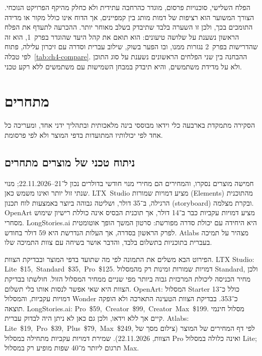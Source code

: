 הפלח השלישי, סוכנויות פרסום, מוגדר כהרחבה עתידית ולא כחלק מהיקף הפרויקט הנוכחי. הצורך המשוער הוא רציפות של דמות מותג בין קמפיינים, אך הדוח אינו כולל מקור או מדידה התומכים בכך, ולכן זו השערה בלבד שתיבדק בשלב מאוחר יותר. ההכרעה לתעדף את הפלח הראשון נשענת על שלושה טיעונים: הוא תואם את קהל היעד שהוגדר בפרק~1, הוא זה שהדרישות בפרק~2 נגזרות ממנו, ובו הפער בשוק, שילוב עברית וסדרה עם זיכרון עלילה, פתוח לפי טבלה~\ref{tab:ch4-compare}. ההבחנה בין שני הפלחים הראשונים נשענת על סוג התוכן ולא על מדידת משתמשים, והיא תיבדק במבחן השמישות עם משתמשים ללא רקע טכני.

\section{מתחרים}
הסקירה מתמקדת בארבעה כלי וידאו מבוססי בינה מלאכותית ובתהליך ידני אחד, ומעריכה כל אחד לפי יכולותיו המתועדות בדפי המוצר ולא לפי פרסומת.

\subsection{ניתוח טכני של מוצרים מתחרים}
חמישה מוצרים נסקרו, והמחירים הם מחירי מנוי חודשי בדולרים נכון ל־\mbox{\textenglish{21--22.11.2026}}; מנוי שנתי זול יותר ואינו משמש כאן. \mbox{\textenglish{LTX Studio}} \cite{ltxstudio} מציע דמויות שמורות (\textenglish{Elements}) מהתוכנית הרגילה, ב־35 דולר, ושליטה גבוהה ביוצר באמצעות לוח תכנון (\textenglish{storyboard}) ובקרת מצלמה. \textenglish{OpenArt} \cite{openart} מציע דמויות עקביות כבר ב־14 דולר, אך תוכנית הבסיס אינה כוללת רישיון שימוש מסחרי. \textenglish{LongStories.ai} \cite{longstories} היא היחידה עם יכולת סדרה מפורשת: סרטון המשך הופך אוטומטית לפרק הראשון בסדרה, אך העלות הנדרשת היא 59 דולר בחודש. \textenglish{Atlabs} \cite{atlabs} מצהיר על תמיכה בעברית בתוכניות בתשלום בלבד, והדבר אושר בשיחה עם צוות התמיכה שלו.

הפירוט הבא משלים את התמונה לפי מה שתועד בדפי המוצר ובבדיקת הצוות. \textenglish{LTX Studio}: \mbox{\textenglish{Lite \$15, Standard \$35, Pro \$125}}. דמויות שמורות זמינות רק מהמסלול \textenglish{Standard}, ולכן מחיר הכניסה ליכולת המרכזית גבוה ביותר מפי שניים ממחיר המסלול הזול. חולשתו בבדיקת הצוות היא שאי אפשר לנסות אותו בלי תשלום. \textenglish{OpenArt}: המסלול \textenglish{Starter} כולל כ־13 דמויות עקביות, והמסלול \textenglish{Wonder} כ־353. בבדיקת הצוות הטעינה התארכה ולא הופקה תוצאה. \textenglish{LongStories.ai}: \mbox{\textenglish{Pro \$59, Creator \$99, Creator Max \$199}}. מסלול חינמי קיים אך ללא וידאו, ולכן גם כאן לא ניתן היה לבדוק עברית. \textenglish{Atlabs}: \mbox{\textenglish{Lite \$19, Pro \$39, Plus \$79, Max \$249}}, לפי דף המחירים של המוצר (צילום מסך של הצוות, 22.11.2026). שמירת דמויות עקביות מתחילה במסלול \textenglish{Pro} ואינה כלולה במסלול \textenglish{Lite}; תרגום ליותר מ־40 שפות מופיע רק במסלול \textenglish{Max}.

